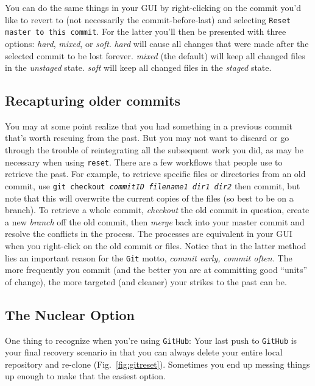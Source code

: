 \documentclass[12pt,letterpaper]{article}
\begin{document}
You can do the same things in your GUI by right-clicking on the commit you'd 
like to revert to (not necessarily the commit-before-last) and selecting 
\texttt{Reset master to this commit}.
For the latter you'll then be presented with three options: 
\emph{hard}, \emph{mixed}, or \emph{soft}.
\emph{hard} will cause all changes that were made after the selected commit to  be lost forever.
\emph{mixed} (the default) will keep all changed files in the \emph{unstaged} state.
\emph{soft} will keep all changed files in the \emph{staged} state.


\subsection{Recapturing older commits}
You may at some point realize that you had something in a previous commit 
that's worth rescuing from the past. 
But you may not want to discard or go through the trouble of reintegrating all 
the subsequent work you did, as may be necessary when using \texttt{reset}.
There are a few workflows that people use to retrieve the past.
For example, to retrieve specific files or directories from an old commit, 
use \texttt{git checkout \emph{commitID} \emph{filename1} \emph{dir1} 
\emph{dir2}} then commit, 
but note that this will overwrite the current copies of the files
(so best to be on a branch).
To retrieve a whole commit, \emph{checkout} the old commit in question, 
create a new \emph{branch} off the old commit, 
then \emph{merge} back into your master commit and resolve the conflicts in 
the process.
The processes are equivalent in your GUI when you right-click on the old 
commit or files.
Notice that in the latter method lies an important reason for the \texttt{Git} motto, \emph{commit early, commit often.}
The more frequently you commit
(and the better you are at committing good ``units'' of change), 
the more targeted (and cleaner) your strikes to the past can be.


\subsection{The Nuclear Option}
One thing to recognize when you're using \texttt{GitHub}:
Your last push to \texttt{GitHub} is your final recovery scenario in that you can 
always delete your entire local repository and re-clone (Fig.~\ref{fig:gitreset}).
Sometimes you end up messing things up enough to make that the easiest 
option.
\end{document}

